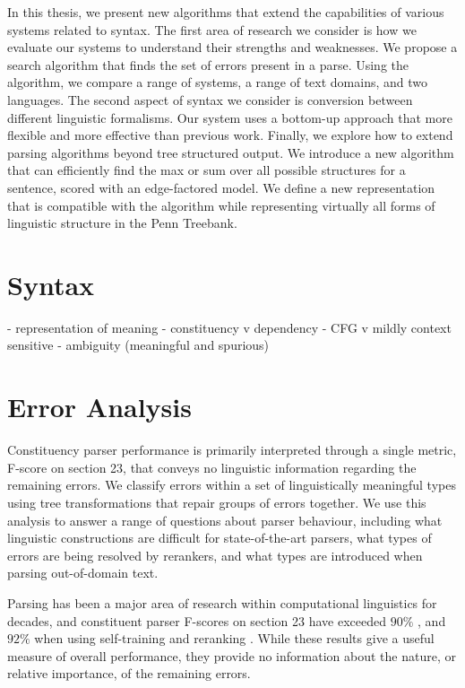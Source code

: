 In this thesis, we present new algorithms that extend the capabilities of various systems related to syntax.
The first area of research we consider is how we evaluate our systems to understand their strengths and weaknesses.
We propose a search algorithm that finds the set of errors present in a parse.
Using the algorithm, we compare a range of systems, a range of text domains, and two languages.
The second aspect of syntax we consider is conversion between different linguistic formalisms.
Our system uses a bottom-up approach that more flexible and more effective than previous work.
Finally, we explore how to extend parsing algorithms beyond tree structured output.
We introduce a new algorithm that can efficiently find the max or sum over all possible structures for a sentence, scored with an edge-factored model.
We define a new representation that is compatible with the algorithm while representing virtually all forms of linguistic structure in the Penn Treebank.

\section{Syntax}
 - representation of meaning
 - constituency v dependency
 - CFG v mildly context sensitive
 - ambiguity (meaningful and spurious)

\section{Error Analysis}

Constituency parser performance is primarily interpreted through a single
metric, F-score on \wsj section 23, that conveys no linguistic information
regarding the remaining errors.  We classify errors within a set of
linguistically meaningful types using tree transformations that repair groups
of errors together.  We use this analysis to answer a range of questions about
parser behaviour, including what linguistic constructions are difficult for
state-of-the-art parsers, what types of errors are being resolved by rerankers,
and what types are introduced when parsing out-of-domain text.


Parsing has been a major area of research within computational linguistics for
decades, and constituent parser F-scores on \wsj section 23 have exceeded
$90\%$ \parencite{Petrov-Klein:2007}, and $92\%$ when using self-training and
reranking \parencite{McClosky-Charniak-Johnson:2006,Charniak-Johnson:2005}. 
While these results give a useful measure of overall performance, they provide
no information about the nature, or relative importance, of the remaining
errors.

